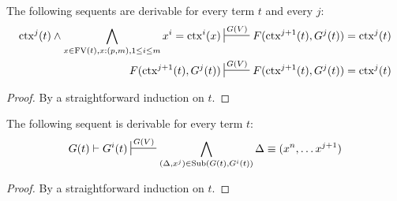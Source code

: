 \documentclass[reqno]{amsart}
\theoremstyle{definition}
\theoremstyle{remark}
\newcommand{\fs}[1]{\mathrm{#1}}
\newcommand{\FV}{\fs{FV}}
\newcommand{\ctx}{\fs{ctx}}
\newcommand{\sub}{\fs{Sub}}
\numberwithin{figure}{section}
\begin{document}
\begin{lem}
The following sequents are derivable for every term $t$ and every $j$:
\begin{align*}
\ctx^j(t) \land \bigwedge_{x \in \FV(t), x : (p,m), 1 \leq i \leq m} x^i = \ctx^i(x) & \sststile{}{G(V)} F(\ctx^{j+1}(t), G^j(t)) = \ctx^j(t) \\
F(\ctx^{j+1}(t), G^j(t)) & \sststile{}{G(V)} F(\ctx^{j+1}(t), G^j(t)) = \ctx^j(t)
\end{align*}
\end{lem}
\begin{proof}
By a straightforward induction on $t$.
\end{proof}

\begin{lem}
The following sequent is derivable for every term $t$:
\[ G(t) \vdash G^i(t) \sststile{}{G(V)} \bigwedge_{(\Delta,x^j) \in \sub(G(t),G^i(t))} \Delta \equiv (x^n, \ldots x^{j+1}) \]
\end{lem}
\begin{proof}
By a straightforward induction on $t$.
\end{proof}
\end{document}
